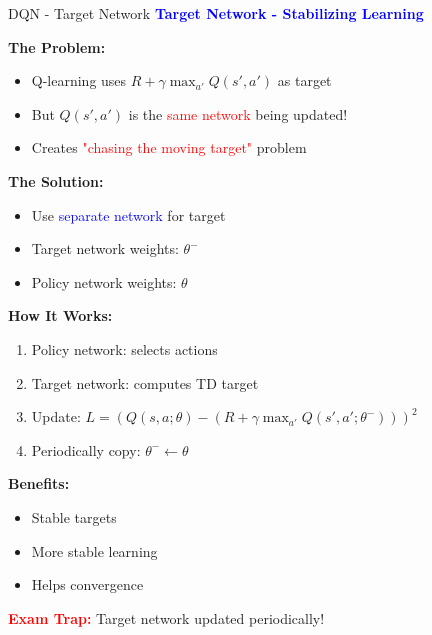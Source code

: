 \documentclass[8pt]{beamer}
\begin{document}
	\begin{frame}{DQN - Target Network}
		\fontsize{6.5}{7.5}\selectfont
		\textcolor{blue}{\textbf{Target Network - Stabilizing Learning}}
		
		\textbf{The Problem:}
		\begin{itemize}
			\item Q-learning uses $R + \gamma \max_{a'} Q(s',a')$ as target
			\item But $Q(s',a')$ is the \textcolor{red}{same network} being updated!
			\item Creates \textcolor{red}{"chasing the moving target"} problem
		\end{itemize}
		
		\textbf{The Solution:}
		\begin{itemize}
			\item Use \textcolor{blue}{separate network} for target
			\item Target network weights: $\theta^-$
			\item Policy network weights: $\theta$
		\end{itemize}
		
		\textbf{How It Works:}
		\begin{enumerate}
			\item Policy network: selects actions
			\item Target network: computes TD target
			\item Update: $L = (Q(s,a;\theta) - (R + \gamma \max_{a'} Q(s',a';\theta^-)))^2$
			\item Periodically copy: $\theta^- \leftarrow \theta$
		\end{enumerate}
		
		\textbf{Benefits:}
		\begin{itemize}
			\item Stable targets
			\item More stable learning
			\item Helps convergence
		\end{itemize}
		
		\textcolor{red}{\textbf{Exam Trap:}} Target network updated periodically!
	\end{frame}
	
\end{document}

